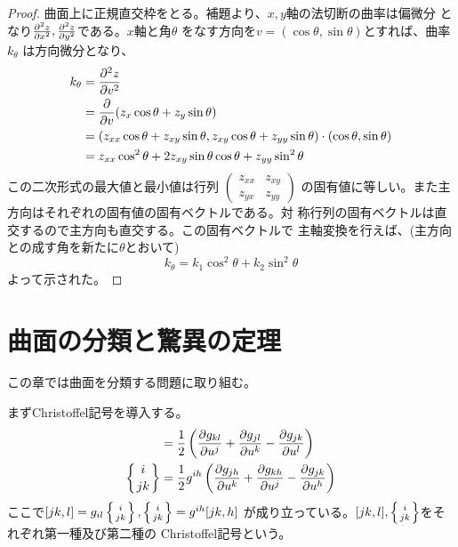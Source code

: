             \begin{proof}
                曲面上に正規直交枠をとる。補題より、$x,y$軸の法切断の曲率は偏微分
                となり$\pd[^2z]{x^2},\pd[^2z]{y^2}$である。$x$軸と角$\theta$
                をなす方向を$v=(\cos\theta,\sin\theta)$とすれば、曲率$k_\theta$
                は方向微分となり、
                \begin{align*}
                    k_\theta &= \pd[^2z]{v^2}\\
                    &= \pd{v} (z_x\cos\theta + z_y\sin\theta)\\
                    &= (z_{xx}\cos\theta + z_{xy}\sin\theta,
                    z_{xy}\cos\theta + z_{yy}\sin\theta)
                    \cdot(\cos\theta,\sin\theta)\\
                    &= z_{xx}\cos^2\theta + 2z_{xy}\sin\theta\cos\theta + z_{yy}\sin^2\theta
                \end{align*}
                この二次形式の最大値と最小値は行列
                $\begin{pmatrix}z_{xx} & z_{xy}\\ z_{yx} & z_{yy}\end{pmatrix}$
                の固有値に等しい。また主方向はそれぞれの固有値の固有ベクトルである。対
                称行列の固有ベクトルは直交するので主方向も直交する。この固有ベクトルで
                主軸変換を行えば、(主方向との成す角を新たに$\theta$とおいて)
                    \[k_\theta = k_1\cos^2\theta + k_2\sin^2\theta\]
                よって示された。
            \end{proof}
            
            
    \section{曲面の分類と驚異の定理}
        この章では曲面を分類する問題に取り組む。

        まずChristoffel記号を導入する。
        \begin{align*}
            [jk,l] &= \rec{2}\lr{\pd[g_{kl}]{u^j}+\pd[g_{jl}]{u^k}
            -\pd[g_{jk}]{u^l}}\\
            \chr{i}{jk} &= \rec{2}g^{ih}\lr{\pd[g_{jh}]{u^k}+\pd[g_{kh}]{u^j}
            -\pd[g_{jk}]{u^h}}
        \end{align*}
        ここで$[jk,l]=g_{il}\chr{i}{jk},\chr{i}{jk}=g^{ih}[jk,h]$
        が成り立っている。$[jk,l],\chr{i}{jk}$をそれぞれ第一種及び第二種の
        Christoffel記号という。



